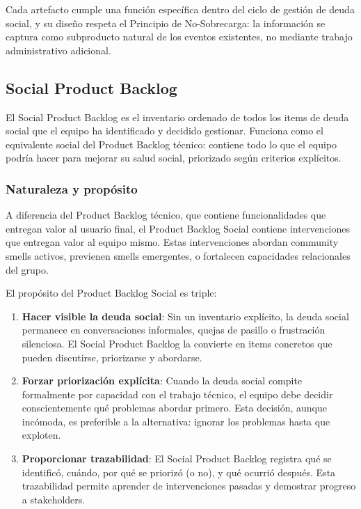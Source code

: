 \FloatBarrier

Cada artefacto cumple una función específica dentro del ciclo de gestión de deuda social, y su diseño respeta el Principio de No-Sobrecarga: la información se captura como subproducto natural de los eventos existentes, no mediante trabajo administrativo adicional.

\subsection{Social Product Backlog}

El Social Product Backlog es el inventario ordenado de todos los items de deuda social que el equipo ha identificado y decidido gestionar. Funciona como el equivalente social del Product Backlog técnico: contiene todo lo que el equipo podría hacer para mejorar su salud social, priorizado según criterios explícitos.

\subsubsection{Naturaleza y propósito}

A diferencia del Product Backlog técnico, que contiene funcionalidades que entregan valor al usuario final, el Product Backlog Social contiene intervenciones que entregan valor al equipo mismo. Estas intervenciones abordan community smells activos, previenen smells emergentes, o fortalecen capacidades relacionales del grupo.

El propósito del Product Backlog Social es triple:

\begin{enumerate}
    \item \textbf{Hacer visible la deuda social}: Sin un inventario explícito, la deuda social permanece en conversaciones informales, quejas de pasillo o frustración silenciosa. El Social Product Backlog la convierte en items concretos que pueden discutirse, priorizarse y abordarse.

    \item \textbf{Forzar priorización explícita}: Cuando la deuda social compite formalmente por capacidad con el trabajo técnico, el equipo debe decidir conscientemente qué problemas abordar primero. Esta decisión, aunque incómoda, es preferible a la alternativa: ignorar los problemas hasta que exploten.

    \item \textbf{Proporcionar trazabilidad}: El Social Product Backlog registra qué se identificó, cuándo, por qué se priorizó (o no), y qué ocurrió después. Esta trazabilidad permite aprender de intervenciones pasadas y demostrar progreso a stakeholders.
\end{enumerate}

